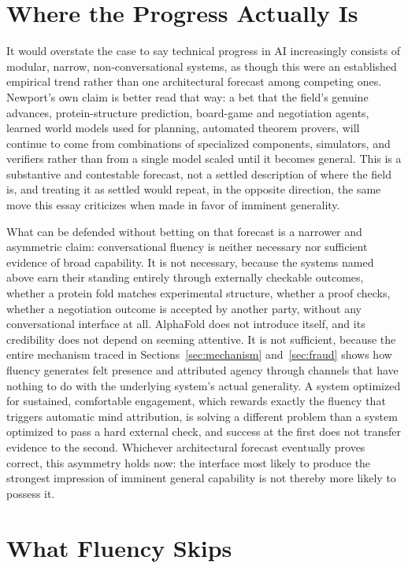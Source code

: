 \documentclass[11pt]{article}
\begin{document}
\section{Where the Progress Actually Is}
\label{sec:progress}

It would overstate the case to say technical progress in AI increasingly consists of modular, narrow, non-conversational systems, as though this were an established empirical trend rather than one architectural forecast among competing ones. Newport's own claim is better read that way: a bet that the field's genuine advances, protein-structure prediction, board-game and negotiation agents, learned world models used for planning, automated theorem provers, will continue to come from combinations of specialized components, simulators, and verifiers rather than from a single model scaled until it becomes general. This is a substantive and contestable forecast, not a settled description of where the field is, and treating it as settled would repeat, in the opposite direction, the same move this essay criticizes when made in favor of imminent generality.

What can be defended without betting on that forecast is a narrower and asymmetric claim: conversational fluency is neither necessary nor sufficient evidence of broad capability. It is not necessary, because the systems named above earn their standing entirely through externally checkable outcomes, whether a protein fold matches experimental structure, whether a proof checks, whether a negotiation outcome is accepted by another party, without any conversational interface at all. AlphaFold does not introduce itself, and its credibility does not depend on seeming attentive. It is not sufficient, because the entire mechanism traced in Sections~\ref{sec:mechanism} and~\ref{sec:fraud} shows how fluency generates felt presence and attributed agency through channels that have nothing to do with the underlying system's actual generality. A system optimized for sustained, comfortable engagement, which rewards exactly the fluency that triggers automatic mind attribution, is solving a different problem than a system optimized to pass a hard external check, and success at the first does not transfer evidence to the second. Whichever architectural forecast eventually proves correct, this asymmetry holds now: the interface most likely to produce the strongest impression of imminent general capability is not thereby more likely to possess it.

\section{What Fluency Skips}
\label{sec:skips}
\end{document}
